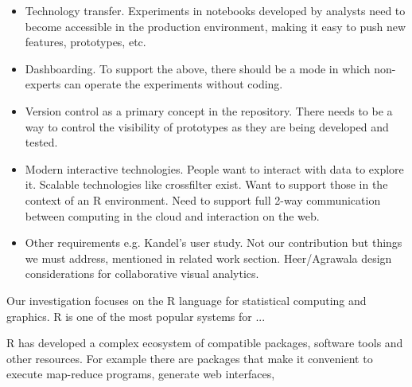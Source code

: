 \begin{itemize}
\item Technology transfer. Experiments in notebooks developed by analysts need to become accessible in the production environment, making it easy to push new features, prototypes, etc.
\item Dashboarding. To support the above, there should be a mode in which non-experts
can operate the experiments without coding.
\item Version control as a primary concept in the repository. There needs to be a way to control the visibility of prototypes as they are being developed and tested.
\item Modern interactive technologies. People want to interact with data to explore it. Scalable technologies like crossfilter exist. Want to support those in the context of an R environment. Need to support full 2-way communication between computing in the cloud and interaction on the web.
\item Other requirements e.g. Kandel's user study. Not our contribution but things we must address, mentioned in related work section. Heer/Agrawala design considerations for collaborative visual analytics.
\end{itemize}

Our investigation focuses on the R language \cite{RCoreTeam:2013:R}
for statistical computing and graphics. R is one of the most popular
systems for ...

R has developed a complex ecosystem of compatible packages, software
tools and other resources. For example there are packages that make
it convenient to execute map-reduce programs, generate web interfaces,

